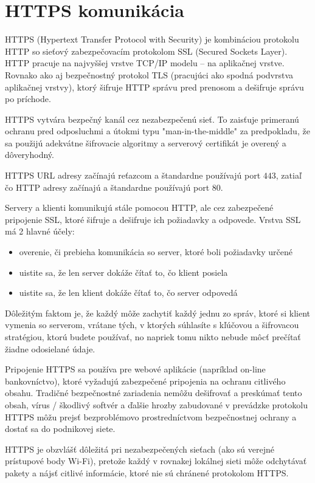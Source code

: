 \chapter{HTTPS komunikácia}
HTTPS (Hypertext Transfer Protocol with Security) je kombináciou protokolu HTTP so sieťový zabezpečovacím protokolom SSL (Secured Sockets Layer). HTTP pracuje na najvyššej vrstve TCP/IP modelu -- na aplikačnej vrstve. Rovnako ako aj bezpečnostný protokol TLS (pracujúci ako spodná podvrstva aplikačnej vrstvy), ktorý šifruje HTTP správu pred prenosom a dešifruje správu po príchode.

HTTPS vytvára bezpečný kanál cez nezabezpečenú sieť. To zaisťuje primeranú ochranu pred odposluchmi a útokmi typu "man-in-the-middle" za predpokladu, že sa použijú adekvátne šifrovacie algoritmy a serverový certifikát je overený a dôveryhodný. 

HTTPS URL adresy začínajú reťazcom  a štandardne používajú port $443$, zatiaľ čo HTTP adresy začínajú  a štandardne používajú port $80$.

Servery a klienti komunikujú stále pomocou HTTP, ale cez zabezpečené pripojenie SSL, ktoré šifruje a dešifruje ich požiadavky a odpovede. Vrstva SSL má 2 hlavné účely:

\begin{itemize}
	\item overenie, či prebieha komunikácia so server, ktoré boli požiadavky určené
	\item uistite sa, že len server dokáže čítať to, čo klient posiela
	\item uistite sa, že len klient dokáže čítať to, čo server odpovedá
\end{itemize}

Dôležitým faktom je, že každý môže zachytiť každý jednu zo správ, ktoré si klient vymenia so serverom, vrátane tých, v ktorých súhlasíte s kľúčovou a šifrovacou stratégiou, ktorú budete používať, no napriek tomu nikto nebude môcť prečítať žiadne odosielané údaje.

Pripojenie HTTPS sa používa pre webové aplikácie (napríklad on-line bankovníctvo), ktoré vyžadujú zabezpečené pripojenia na ochranu citlivého obsahu. Tradičné bezpečnostné zariadenia nemôžu dešifrovať a preskúmať tento obsah, vírus / škodlivý softvér a ďalšie hrozby zabudované v prevádzke protokolu HTTPS môžu prejsť bezproblémovo prostredníctvom bezpečnostnej ochrany a dostať sa do podnikovej siete.

HTTPS je obzvlášť dôležitá pri nezabezpečených sieťach (ako sú verejné prístupové body Wi-Fi), pretože každý v rovnakej lokálnej sieti môže odchytávať pakety a nájsť citlivé informácie, ktoré nie sú chránené protokolom HTTPS.

